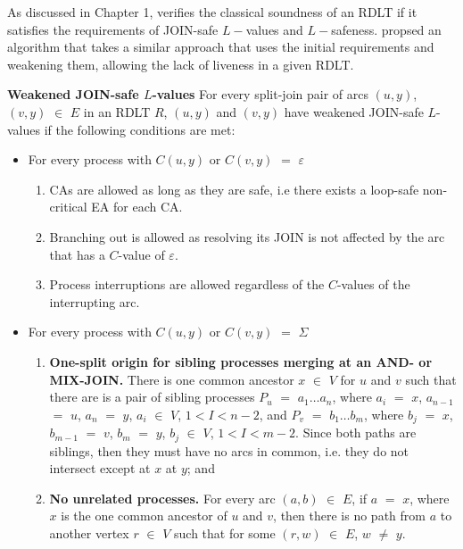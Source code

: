 As discussed in Chapter 1, \cite{MalinaoPJS2023} verifies the classical soundness of an RDLT if it satisfies the requirements of JOIN-safe $L-$values and $L-$safeness. \cite{Ramirez2024} propsed an algorithm that takes a similar approach that uses the initial requirements and weakening them, allowing the lack of liveness in a given RDLT.
\begin{defn}\textbf{Weakened JOIN-safe $ L $-values}
    \label{WJVals}
    For every split-join pair of arcs $ (u,y) $, $ (v,y) $ $ \in $ $ E $ in an RDLT $ R $, $ (u,y) $ and $ (v,y) $ have weakened JOIN-safe $ L $-values if the following conditions are met:
    \begin{itemize}
        \item For every process with $ C(u,y) $ or $  C(v,y) $ $ = $ $ \varepsilon $
        \begin{enumerate}
            \item CAs are allowed as long as they are safe, i.e there exists a loop-safe non-critical EA for each CA.
            \item Branching out is allowed as resolving its JOIN is not affected by the arc that has a $ C $-value of $ \varepsilon $.
            \item Process interruptions are allowed regardless of the $ C $-values of the interrupting arc.
        \end{enumerate}
        \item For every process with $ C(u,y) $ or $  C(v,y) $ $ = $ $ \Sigma $
        \begin{enumerate}
            \item \textbf{One-split origin for sibling processes merging at an AND- or MIX-JOIN.} There is one common ancestor $ x $ $ \in $ $ V $ for $ u $ and $ v $ such that there are is a pair of sibling processes $ P_u $ $ = $ $ a_1 \ldots a_n $, where $ a_i $ $ = $ $ x $, $ a_{n-1} $ $ = $ $ u $, $ a_n $ $ = $ $ y $, $ a_i $ $ \in $ $ V $, $ 1 < I < n - 2 $, and $ P_v $ $ = $ $ b_1 \ldots b_m $, where $ b_j $ $ = $ $ x $, $ b_{m-1} $ $ = $ $ v $, $ b_m $ $ = $ $ y $, $ b_j $ $ \in $ $ V $, $ 1 < I < m - 2 $.  Since both paths are siblings, then they must have no arcs in common, i.e. they do not intersect except at $ x $ at $ y $; and
            \item \textbf{No unrelated processes.} For every arc $ (a,b) $ $ \in $ $ E $, if $ a $ $ = $ $ x $, where $ x $ is the one common ancestor of $ u $ and $ v $, then there is no path from $ a $ to another vertex $ r $ $ \in $ $ V $ such that for some $ (r,w) $ $ \in $ $ E $, $ w $ $ \neq $ $ y $.

\end{enumerate}
\end{itemize}
\end{defn}
